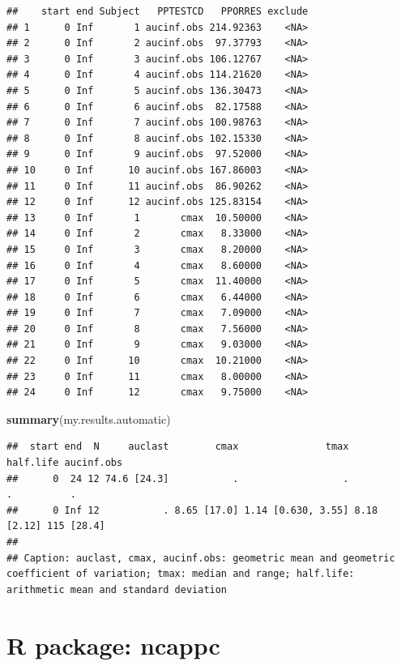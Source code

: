 \documentclass[
  10pt,
]{krantz}
\makeatletter
\newenvironment{Shaded}{\begin{snugshade}}{\end{snugshade}}
\newcommand{\KeywordTok}[1]{\textcolor[rgb]{0.13,0.29,0.53}{\textbf{#1}}}
\newcommand{\NormalTok}[1]{#1}
\newenvironment{kframe}{%
\medskip{}
\setlength{\fboxsep}{.8em}
 \def\at@end@of@kframe{}%
 \ifinner\ifhmode%
  \def\at@end@of@kframe{\end{minipage}}%
  \begin{minipage}{\columnwidth}%
 \fi\fi%
 \def\FrameCommand##1{\hskip\@totalleftmargin \hskip-\fboxsep
 \colorbox{shadecolor}{##1}\hskip-\fboxsep
     \hskip-\linewidth \hskip-\@totalleftmargin \hskip\columnwidth}%
 \MakeFramed {\advance\hsize-\width
   \@totalleftmargin\z@ \linewidth\hsize
   \@setminipage}}%
 {\par\unskip\endMakeFramed%
 \at@end@of@kframe}
\renewenvironment{Shaded}{\begin{kframe}}{\end{kframe}}
\makeatother
\begin{document}
\begin{verbatim}
##    start end Subject   PPTESTCD   PPORRES exclude
## 1      0 Inf       1 aucinf.obs 214.92363    <NA>
## 2      0 Inf       2 aucinf.obs  97.37793    <NA>
## 3      0 Inf       3 aucinf.obs 106.12767    <NA>
## 4      0 Inf       4 aucinf.obs 114.21620    <NA>
## 5      0 Inf       5 aucinf.obs 136.30473    <NA>
## 6      0 Inf       6 aucinf.obs  82.17588    <NA>
## 7      0 Inf       7 aucinf.obs 100.98763    <NA>
## 8      0 Inf       8 aucinf.obs 102.15330    <NA>
## 9      0 Inf       9 aucinf.obs  97.52000    <NA>
## 10     0 Inf      10 aucinf.obs 167.86003    <NA>
## 11     0 Inf      11 aucinf.obs  86.90262    <NA>
## 12     0 Inf      12 aucinf.obs 125.83154    <NA>
## 13     0 Inf       1       cmax  10.50000    <NA>
## 14     0 Inf       2       cmax   8.33000    <NA>
## 15     0 Inf       3       cmax   8.20000    <NA>
## 16     0 Inf       4       cmax   8.60000    <NA>
## 17     0 Inf       5       cmax  11.40000    <NA>
## 18     0 Inf       6       cmax   6.44000    <NA>
## 19     0 Inf       7       cmax   7.09000    <NA>
## 20     0 Inf       8       cmax   7.56000    <NA>
## 21     0 Inf       9       cmax   9.03000    <NA>
## 22     0 Inf      10       cmax  10.21000    <NA>
## 23     0 Inf      11       cmax   8.00000    <NA>
## 24     0 Inf      12       cmax   9.75000    <NA>
\end{verbatim}

\begin{Shaded}
\begin{Highlighting}[]
\KeywordTok{summary}\NormalTok{(my.results.automatic)}
\end{Highlighting}
\end{Shaded}

\begin{verbatim}
##  start end  N     auclast        cmax               tmax   half.life aucinf.obs
##      0  24 12 74.6 [24.3]           .                  .           .          .
##      0 Inf 12           . 8.65 [17.0] 1.14 [0.630, 3.55] 8.18 [2.12] 115 [28.4]
## 
## Caption: auclast, cmax, aucinf.obs: geometric mean and geometric coefficient of variation; tmax: median and range; half.life: arithmetic mean and standard deviation
\end{verbatim}

\hypertarget{r-package-ncappc}{%
\section{R package: ncappc}\label{r-package-ncappc}}
\end{document}
